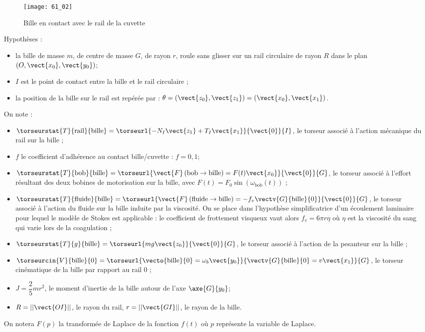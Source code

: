 \begin{figure}[H]
\centering
\texttt{[image: 61\_02]}
\caption{\label{61_02} Bille en contact avec le rail de la cuvette}
\end{figure}

Hypothèses :
\begin{itemize}
\item la bille de masse $m$, de centre de masse $G$, de rayon $r$,
roule sans glisser sur un rail circulaire de rayon $R$ dans
le plan $\left(O,\vect{x_0},\vect{y_0}\right)$;
\item $I$ est le point de contact entre la bille et le rail circulaire ;
\item la position de la bille sur le rail est repérée par : $\theta = \left(\vect{z_0},\vect{z_1} \right)= \left(\vect{x_0},\vect{x_1} \right)$.
\end{itemize}

On note :
\begin{itemize}
\item $\torseurstat{T}{\text{rail}}{\text{bille}} = \torseurl{-N_I\vect{z_1}+T_I\vect{x_1}}{\vect{0}}{I}$, le torseur associé à l’action mécanique du rail sur la bille ;
\item $f$ le coefficient d’adhérence au contact bille/cuvette : $f=0,1$; 
\item $\torseurstat{T}{\text{bob}}{\text{bille}} = \torseurl{\vect{F}\left(\text{bob} \rightarrow \text{bille} \right)=F(t)\vect{x_0}}{\vect{0}}{G}$, le torseur associé à l’effort résultant des deux bobines de motorisation sur la bille, avec $F(t)=F_0\sin\left(\omega_{\text{bob}}(t)\right)$ ;
\item $\torseurstat{T}{\text{fluide}}{\text{bille}} = \torseurl{\vect{F}\left(\text{fluide} \rightarrow \text{bille} \right)=-f_v\vectv{G}{\text{bille}}{0}}{\vect{0}}{G}$, le torseur associé à
l’action du fluide sur la bille induite par la viscosité. On se place dans l’hypothèse
simplificatrice d’un écoulement laminaire pour lequel le modèle de Stokes est applicable : le
coefficient de frottement visqueux vaut alors $f_v = 6\pi r \eta $  où $\eta$ est la viscosité du sang qui
varie lors de la coagulation ;
\item $\torseurstat{T}{g}{\text{bille}} = \torseurl{mg\vect{z_0}}{\vect{0}}{G}$, le torseur associé à l’action de la pesanteur sur la bille ;
\item $\torseurcin{V}{\text{bille}}{0} = \torseurl{\vecto{\text{bille}}{0}=\omega_b \vect{y_0}}{\vectv{G}{\text{bille}}{0}=v\vect{x_1}}{G}$, le torseur cinématique de la bille par rapport au rail 0 ;
\item $J = \dfrac{2}{5}mr^2$, le moment d’inertie de la bille autour de l’axe $\axe{G}{y_0}$;
\item $R=||\vect{OI}||$, le rayon du rail, $r=||\vect{GI}||$, le rayon de la bille.
\end{itemize}
On notera $F(p)$ la transformée de Laplace de la fonction $f(t)$ où $p$ représente la variable de
Laplace.
\fi

